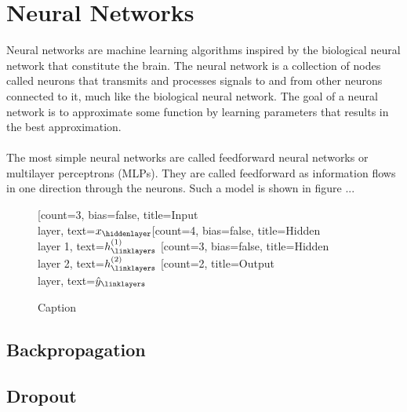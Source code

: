 \chapter{Neural Networks}
Neural networks are machine learning algorithms inspired by the biological neural network that constitute the brain. The neural network is a collection of nodes called neurons that transmits and processes signals to and from other neurons connected to it, much like the biological neural network. The goal of a neural network is to approximate some function by learning parameters that results in the best approximation.
\\
\\
The most simple neural networks are called feedforward neural networks or multilayer perceptrons (MLPs). They are called feedforward as information flows in one direction through the neurons. Such a model is shown in figure ...

\begin{figure}
    \centering
    \begin{neuralnetwork}[height=4]
        \newcommand{\x}[2]{$x_#2$}
        \newcommand{\y}[2]{$\hat{y}_#2$}
        \newcommand{\hfirst}[2]{\small $h^{(1)}_#2$}
        \newcommand{\hsecond}[2]{\small $h^{(2)}_#2$}
        [count=3, bias=false, title=Input\\layer, text=\x]
        \hiddenlayer[count=4, bias=false, title=Hidden\\layer 1, text=\hfirst] \linklayers
        \hiddenlayer[count=3, bias=false, title=Hidden\\layer 2, text=\hsecond] \linklayers
        \outputlayer[count=2, title=Output\\layer, text=\y] \linklayers
    \end{neuralnetwork}
    \caption{Caption}
    \label{fig:my_label}
\end{figure}


\section{Backpropagation} \label{sec:backprop}
\section{Dropout} \label{sec:dropout}